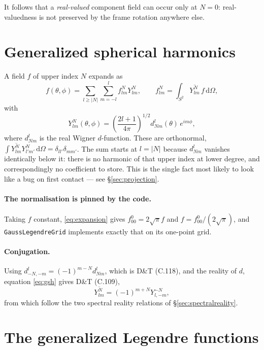 \documentclass[11pt,a4paper]{article}
\newcommand{\conj}[1]{\overline{#1}}
\newcommand{\dOmega}{\,\mathrm{d}\Omega}
\newcommand{\code}[1]{\texttt{#1}}
\begin{document}
It follows that a \emph{real-valued} component field can occur only at
$N=0$: real-valuedness is not preserved by the frame rotation anywhere
else.

\section{Generalized spherical harmonics}
\label{sec:gsh}

A field $f$ of upper index $N$ expands as
\begin{equation}
  f(\theta,\phi) = \sum_{l\geq|N|}\sum_{m=-l}^{l} f^{N}_{lm} Y^{N}_{lm},
  \qquad
  f^{N}_{lm} = \int_{S^2}\conj{Y^{N}_{lm}}\, f \dOmega,
  \label{eq:expansion}
\end{equation}
with
\begin{equation}
  Y^{N}_{lm}(\theta,\phi)
    = \left(\frac{2l+1}{4\pi}\right)^{1/2} d^{l}_{Nm}(\theta)\, e^{im\phi},
  \label{eq:gsh}
\end{equation}
where $d^l_{Nm}$ is the real Wigner $d$-function.  These are orthonormal,
$\int \conj{Y^N_{lm}} Y^N_{l'm'} \dOmega = \delta_{ll'}\delta_{mm'}$.  The
sum starts at $l=|N|$ because $d^l_{Nm}$ vanishes identically below it:
there is no harmonic of that upper index at lower degree, and
correspondingly no coefficient to store.  This is the single fact most
likely to look like a bug on first contact --- see \S\ref{sec:projection}.

\paragraph{The normalisation is pinned by the code.}  Taking $f$ constant,
\eqref{eq:expansion} gives $f^0_{00} = 2\sqrt{\pi}f$ and
$f = f^0_{00}/(2\sqrt{\pi})$, and \code{GaussLegendreGrid} implements
exactly that on its one-point grid.

\paragraph{Conjugation.}  Using $d^l_{-N,-m}=(-1)^{m-N}d^l_{Nm}$, which is
D\&T (C.118), and the reality of $d$, equation \eqref{eq:gsh} gives D\&T
(C.109),
\begin{equation}
  \conj{Y^{N}_{lm}} = (-1)^{m+N} Y^{-N}_{l,-m},
  \label{eq:Yconj}
\end{equation}
from which follow the two spectral reality relations of
\S\ref{sec:spectralreality}.

\section{The generalized Legendre functions}
\label{sec:legendre}
\end{document}
